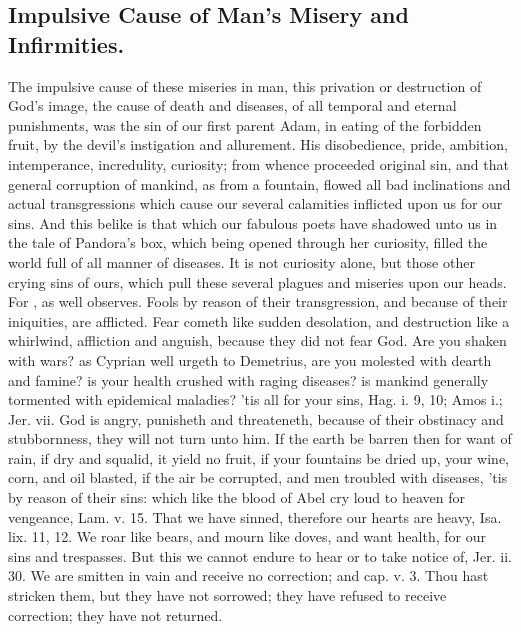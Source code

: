 {\subsection[The Impulsive Cause]{Impulsive Cause of Man's Misery and Infirmities.}
The impulsive cause of these miseries in man, this privation or destruction of God's image, the cause of death and diseases, of all temporal and eternal punishments, was the sin of our first parent Adam, in eating of the forbidden fruit, by the devil's instigation and allurement.
His disobedience, pride, ambition, intemperance, incredulity, curiosity; from whence proceeded original sin, and that general corruption of mankind, as from a fountain, flowed all bad inclinations and actual transgressions which cause our several calamities inflicted upon us for our sins.
And this belike is that which our fabulous poets have shadowed unto us in the tale of  Pandora's box, which being opened through her curiosity, filled the world full of all manner of diseases.
It is not curiosity alone, but those other crying sins of ours, which pull these several plagues and miseries upon our heads.
For , as \Chrysostom{} well observes.
Fools by reason of their transgression, and because of their iniquities, are afflicted.
Fear cometh like sudden desolation, and destruction like a whirlwind, affliction and anguish, because they did not fear God.
Are you shaken with wars? as Cyprian well urgeth to Demetrius, are you molested with dearth and famine? is your health crushed with raging diseases? is mankind generally tormented with epidemical maladies? 'tis all for your sins, Hag. i. 9, 10; Amos i.; Jer. vii.
God is angry, punisheth and threateneth, because of their obstinacy and stubbornness, they will not turn unto him.
If the earth be barren then for want of rain, if dry and squalid, it yield no fruit, if your fountains be dried up, your wine, corn, and oil blasted, if the air be corrupted, and men troubled with diseases, 'tis by reason of their sins: which like the blood of Abel cry loud to heaven for vengeance, Lam. v. 15. That we have sinned, therefore our hearts are heavy, Isa. lix. 11, 12.
We roar like bears, and mourn like doves, and want health, \etc{} for our sins and trespasses.
But this we cannot endure to hear or to take notice of, Jer. ii. 30. We are smitten in vain and receive no correction; and cap. v. 3.
Thou hast stricken them, but they have not sorrowed; they have refused to receive correction; they have not returned.
}
